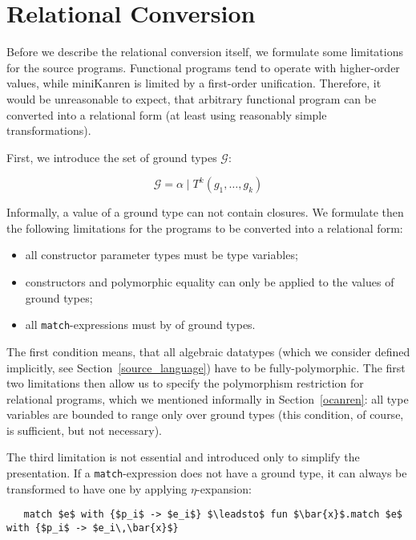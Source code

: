 \section{Relational Conversion}
\label{conversion}
\def\arraystretch{1}

Before we describe the relational conversion itself, we formulate some limitations for the source
programs. Functional programs tend to operate with higher-order values, while miniKanren is
limited by a first-order unification. Therefore, it would be unreasonable to expect, that arbitrary
functional program can be converted into a relational form (at least using reasonably simple 
transformations). 

First, we introduce the set of ground types $\mathcal G$:

$$
\mathcal G=\alpha \mid T^k(g_1,\dots,g_k)
$$

Informally, a value of a ground type can not contain closures. We formulate then the following limitations for
the programs to be converted into a relational form:

\begin{itemize}
  \item all constructor parameter types must be type variables;
  \item constructors and polymorphic equality can only be applied to the values of ground types;
  \item all \lstinline|match|-expressions must by of ground types.
\end{itemize}

The first condition means, that all algebraic datatypes (which we consider defined implicitly, see Section~\ref{source_language}) 
have to be fully-polymorphic. The first two limitations then allow us to specify the polymorphism restriction for 
relational programs, which we mentioned informally in Section~\ref{ocanren}: all type variables are bounded to
range only over ground types (this condition, of course, is sufficient, but not necessary).

The third limitation is not essential and introduced only to simplify the presentation. If a \lstinline|match|-expression does not
have a ground type, it can always be transformed to have one by applying $\eta$-expansion:

\begin{lstlisting}
   match $e$ with {$p_i$ -> $e_i$} $\leadsto$ fun $\bar{x}$.match $e$ with {$p_i$ -> $e_i\,\bar{x}$}
\end{lstlisting}

